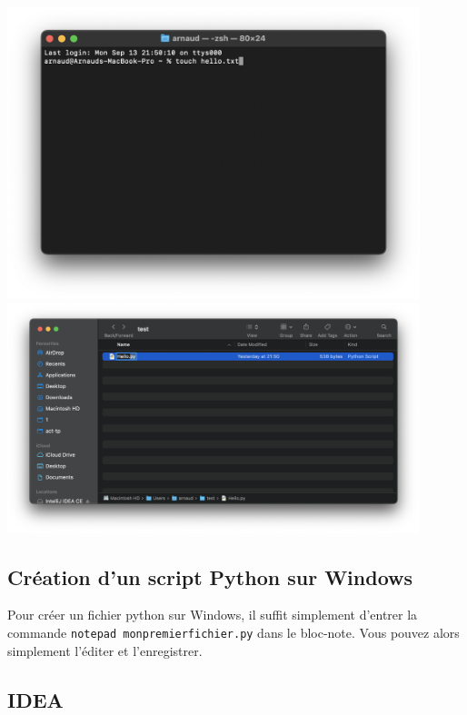 \begin{center}
	\includegraphics[width=12cm]{terminal.png}
	\includegraphics[width=12cm]{py.png}
	
\end{center}

\subsection{Création d'un script Python sur Windows}

Pour créer un fichier python sur Windows, il suffit simplement d'entrer la commande \lstinline{notepad monpremierfichier.py} dans le bloc-note. Vous pouvez alors simplement l'éditer et l'enregistrer.

\subsection{IDEA}

